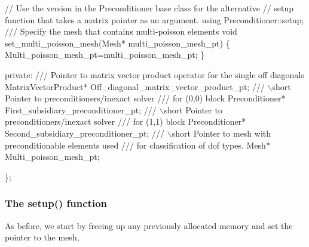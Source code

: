 \begin{DoxyCodeInclude}
  \textcolor{comment}{// Use the version in the Preconditioner base class for the alternative}
  \textcolor{comment}{// setup function that takes a matrix pointer as an argument.}
  \textcolor{keyword}{using} Preconditioner::setup;
\textcolor{comment}{}
\textcolor{comment}{  /// Specify the mesh that contains multi-poisson elements}
\textcolor{comment}{}  \textcolor{keywordtype}{void} set\_multi\_poisson\_mesh(Mesh* multi\_poisson\_mesh\_pt)
  \{
   Multi\_poisson\_mesh\_pt=multi\_poisson\_mesh\_pt;
  \}

 \textcolor{keyword}{private}:  
\textcolor{comment}{}
\textcolor{comment}{  /// Pointer to matrix vector product operator for the single off diagonals}
\textcolor{comment}{}  MatrixVectorProduct* Off\_diagonal\_matrix\_vector\_product\_pt;
\textcolor{comment}{}
\textcolor{comment}{  /// \(\backslash\)short Pointer to preconditioners/inexact solver}
\textcolor{comment}{  /// for (0,0) block}
\textcolor{comment}{}  Preconditioner* First\_subsidiary\_preconditioner\_pt;
  \textcolor{comment}{}
\textcolor{comment}{  /// \(\backslash\)short Pointer to preconditioners/inexact solver}
\textcolor{comment}{  /// for (1,1) block}
\textcolor{comment}{}  Preconditioner* Second\_subsidiary\_preconditioner\_pt;
\textcolor{comment}{}
\textcolor{comment}{  /// \(\backslash\)short Pointer to mesh with preconditionable elements used}
\textcolor{comment}{  /// for classification of dof types.}
\textcolor{comment}{}  Mesh* Multi\_poisson\_mesh\_pt;

 \};

\end{DoxyCodeInclude}
\hypertarget{index_two_plus_three_upper_triangular_setup}{}\subsubsection{The setup() function}\label{index_two_plus_three_upper_triangular_setup}
As before, we start by freeing up any previously allocated memory and set the pointer to the mesh,


